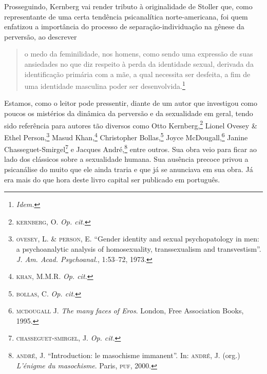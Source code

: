 Prosseguindo, Kernberg vai render tributo à originalidade de Stoller que,
como representante de uma certa tendência psicanalítica norte-americana,
foi quem enfatizou a importância do processo de separação-individuação na
gênese da perversão, ao descrever 

\begin{quote}
o medo da feminilidade, nos homens, como
sendo uma expressão de suas ansiedades no que diz respeito à perda da
identidade sexual, derivada da identificação primária com a mãe, a qual
necessita ser desfeita, a fim de uma identidade masculina poder ser
desenvolvida.\footnote{ \textit{Idem.}}
\end{quote}

\asterisc

Estamos, como o leitor pode pressentir, diante de um autor que investigou
como poucos os mistérios da dinâmica da perversão e da sexualidade em
geral, tendo sido referência para autores tão diversos como Otto
Kernberg,\footnote{ \textsc{kernberg}, O. \textit{Op. cit.}} Lionel Ovesey \& Ethel
Person,\footnote{ \textsc{ovesey}, L. \& \textsc{person}, E. “Gender identity and sexual
psychopatology in men: a psychoanalytic analysis of homosexuality,
transsexualism and transvestism”. \textit{J. Am. Acad. Psychoanal.},
1:53--72, 1973.} Masud Khan,\footnote{ \textsc{khan}, M.M.R.  \textit{Op. cit.}}
Christopher Bollas,\footnote{ \textsc{bollas}, C.  \textit{Op. cit.}} Joyce
McDougall,\footnote{ \textsc{mcdougall} J. \textit{The many faces of Eros}. London,
Free Association Books, 1995.} Janine Chasseguet-Smirgel\footnote{ \textsc{chasseguet-smirgel}, 
J.  \textit{Op. cit.}} e Jacques André,\footnote{ \textsc{andré},
J. “Introduction: le masochisme immanent”. In: \textsc{andré}, J. (org.) 
\textit{L’énigme du masochisme}. Paris, \textsc{puf}, 2000.} entre outros. Sua obra
veio para ficar ao lado dos clássicos sobre a sexualidade humana. Sua
ausência precoce privou a psicanálise do muito que ele ainda traria e que
já se anunciava em sua obra. Já era mais do que hora deste livro capital
ser publicado em português.



